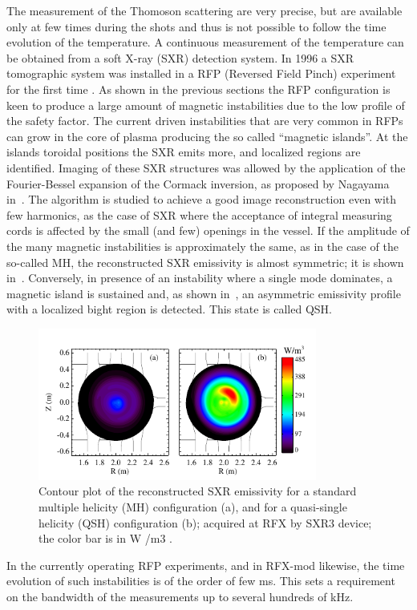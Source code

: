 The measurement of the Thomoson scattering are very precise, but are available only at few times during the shots and thus is not possible to follow the time evolution of the temperature.
A continuous measurement of the temperature can be obtained from a soft X-ray (SXR) detection system. In 1996 a SXR tomographic system was installed in a RFP (Reversed Field
Pinch) experiment for the first time \cite{Franz_2001}. 
As shown in the previous sections the RFP configuration is keen to produce a large amount of magnetic instabilities due to the low profile of the safety factor. The current driven instabilities that are very common in RFPs can grow in the core of plasma producing the so called ``magnetic islands''. 
At the islands toroidal positions the SXR emits more, and localized regions are identified. 
Imaging of these SXR structures was allowed by the application of the Fourier-Bessel expansion of the Cormack inversion, as proposed by Nagayama in~\cite{Bonomo25}. 
The algorithm is studied to achieve a good image reconstruction even with few harmonics, as the case of SXR where the acceptance of integral measuring cords  is affected by the small (and few) openings in the vessel. If the amplitude of the many magnetic instabilities is approximately the same, as in the case of the so-called \acl{MH}, the reconstructed SXR emissivity is almost symmetric; it is shown in~. Conversely, in presence of an instability where a single mode dominates, a magnetic island is sustained and, as shown in~, an asymmetric emissivity profile with a localized bight region is detected. This state is called \acl{QSH}.
%
\begin{figure}
    \centering
    \includegraphics[height=5cm]{img/2_eq/MH_QSH_example.png}
    \caption{Contour plot of the reconstructed SXR emissivity for a standard multiple helicity (MH) configuration (a), and for a quasi-single helicity (QSH) configuration (b); acquired at RFX by SXR3 device; the color bar is in W /m3 .
    }
    \label{fig:MH_QSH_example}
\end{figure}
%
In the currently operating RFP experiments, and in RFX-mod likewise, the time evolution of such instabilities is of the order of few ms. This sets a requirement on the bandwidth of the measurements up to several hundreds of kHz.

